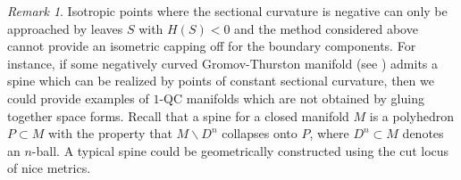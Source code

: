 \documentclass[10pt]{amsart}
\let\moins\smallsetminus
\theoremstyle{definition}
\theoremstyle{remark}
\newtheorem{remark}[theorem]{Remark}
\numberwithin{equation}{section}
\begin{document}
\begin{remark}
Isotropic points where the sectional curvature is negative can only be approached by leaves $S$ with $H(S) <0$
and the method considered above cannot provide an isometric
capping off for the boundary components.
For instance, if some negatively curved Gromov-Thurston
manifold (see \cite{GT}) admits a spine which can be realized by
points of constant sectional curvature, then we could provide
examples of $1$-QC manifolds which are not obtained by gluing together space forms.
Recall that a spine for a closed manifold $M$ is a polyhedron $P\subset M$ with the property that
$M\moins D^n$ collapses onto $P$, where $D^n\subset M$ denotes an $n$-ball. A typical spine could be geometrically
constructed using the cut locus of nice metrics.
\end{remark}
\end{document}
